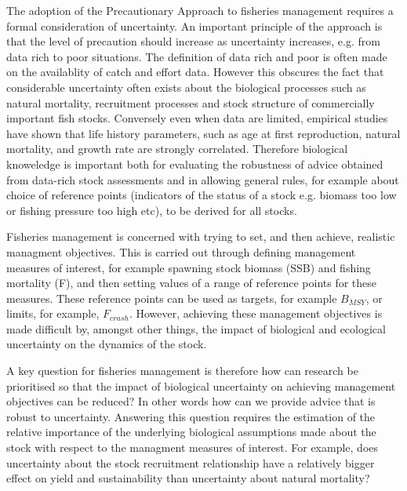 \documentclass[10pt]{article}
\begin{document}

The adoption of the Precautionary Approach to fisheries management \cite{garcia1996precautionary}  requires a formal consideration of uncertainty. An 
important principle of the approach is that the level of precaution should increase as uncertainty increases, e.g. from data rich to poor situations. 
The definition of data rich and poor is often made on the availablity of catch and effort data. However this obscures the fact that considerable uncertainty 
often exists about the biological processes such as natural mortality, recruitment processes and stock structure of commercially important fish stocks. 
Conversely even when data are limited, empirical studies have shown that life history parameters, such as age at first reproduction, natural mortality, 
and growth rate are strongly correlated. Therefore biological knoweledge is important both for evaluating the robustness of advice obtained from data-rich 
stock assessments and in allowing general rules, for example about choice of reference points (indicators of the status of a stock e.g. biomass too low 
or fishing pressure too high etc), to be derived for all stocks.

Fisheries management is concerned with trying to set, and then achieve, realistic managment objectives. This is carried out through defining management 
measures of interest, for example spawning stock biomass (SSB) and fishing mortality (F), and then setting values of a range of reference points for these 
measures. These reference points can be used as targets, for example $B_{MSY}$, or limits, for example, $F_{crash}$. However, achieving these management 
objectives is made difficult by, amongst other things, the impact of biological and ecological uncertainty on the dynamics of the stock.

A key question for fisheries management is therefore how can research be prioritised so that the impact of biological uncertainty on achieving management
objectives can be reduced? In other words how can we provide advice that is robust to uncertainty. Answering this question requires the estimation of the 
relative importance of the underlying biological assumptions made about the stock with respect to the managment measures of interest. For example, does 
uncertainty about the stock recruitment relationship have a relatively bigger effect on yield and sustainability than uncertainty about natural mortality?
\end{document}
